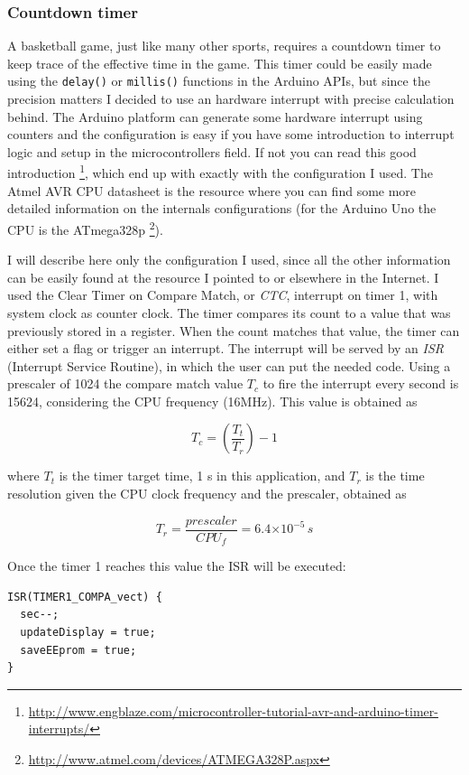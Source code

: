 \documentclass[11pt,english]{article}
\providecommand{\e}[1]{\ensuremath{\times 10^{#1}}}
\newcommand{\code}[1]{\texttt{#1}}
\begin{document}
\subsubsection{Countdown timer} \label{subsubsec:timer}


A basketball game, just like many other sports, requires a countdown timer to keep trace of the effective 
time in the game. This timer could be easily made using the \code{delay()} or \code{millis()} functions 
in the Arduino APIs, but since the precision matters I decided to use an hardware interrupt with precise 
calculation behind. 
The Arduino platform can generate some hardware interrupt using counters and the configuration is easy if 
you have some introduction to interrupt logic and setup in the microcontrollers field. If not you can read 
this good introduction \footnote{\url{http://www.engblaze.com/microcontroller-tutorial-avr-and-arduino-timer-interrupts/}},
which end up with exactly with the configuration I used. The Atmel AVR CPU datasheet is the resource where 
you can find some more detailed information on the internals configurations (for the Arduino Uno the 
CPU is the ATmega328p \footnote{\url{http://www.atmel.com/devices/ATMEGA328P.aspx}}).   

I will describe here only the configuration I used, since all the other information can be easily found at the 
resource I pointed to or elsewhere in the Internet.
I used the Clear Timer on Compare Match, or \emph{CTC}, interrupt on timer 1, with system clock as counter clock.
The timer compares its count to a value that was previously stored in a register. When the count matches that 
value, the timer can either set a flag or trigger an interrupt. The interrupt will be served by an \emph{ISR} 
(Interrupt Service Routine), in which the user can put the needed code.
Using a prescaler of 1024 the compare match value $T_c$ to fire the interrupt every second is 15624, considering 
the CPU frequency (16MHz). This value is obtained as

\[
 T_c = \left(  \frac{T_t}{T_r} \right) - 1 
\]

where $T_t$ is the timer target time, 1 s in this application, and $T_r$ is the time resolution given the CPU 
clock frequency and the prescaler, obtained as

\[
 T_r = \frac{prescaler}{CPU_f} = 6.4\e{-5} \, s
\]
 
Once the timer 1 reaches this value the ISR will be executed: 

%
\begin{lstlisting}[label=lis:timer-ISR,caption=Interrupt Service Routine]
ISR(TIMER1_COMPA_vect) {
  sec--;
  updateDisplay = true;
  saveEEprom = true;
}
\end{lstlisting}
\end{document}
